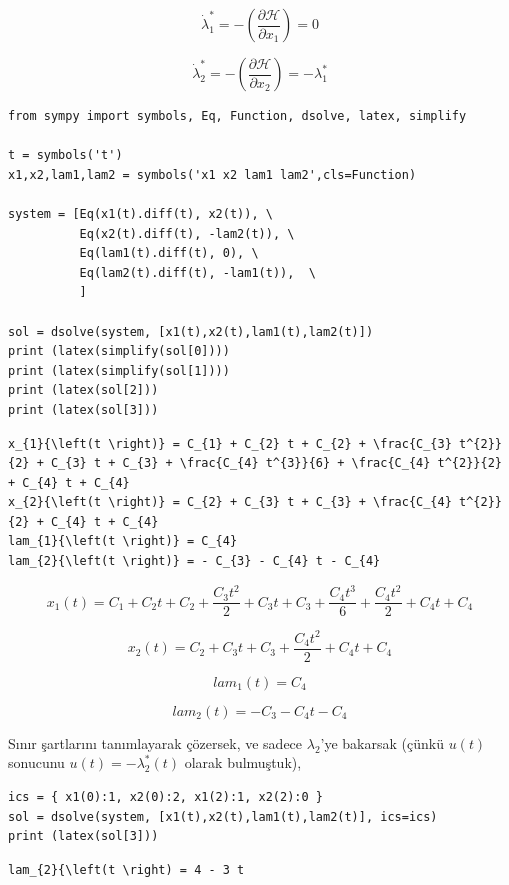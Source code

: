 \documentclass[12pt,fleqn]{article}\usepackage{../../common}
\begin{document}
$$
\dot{\lambda}_1^\ast = - \left( \frac{\partial \mathcal{H}}{\partial x_1} \right) = 0
$$

$$
\dot{\lambda}_2^\ast = - \left( \frac{\partial \mathcal{H}}{\partial x_2} \right) = 
- \lambda_1^\ast
$$

\begin{verbatim}
from sympy import symbols, Eq, Function, dsolve, latex, simplify

t = symbols('t') 
x1,x2,lam1,lam2 = symbols('x1 x2 lam1 lam2',cls=Function)

system = [Eq(x1(t).diff(t), x2(t)), \
          Eq(x2(t).diff(t), -lam2(t)), \
          Eq(lam1(t).diff(t), 0), \
          Eq(lam2(t).diff(t), -lam1(t)),  \
          ]

sol = dsolve(system, [x1(t),x2(t),lam1(t),lam2(t)])
print (latex(simplify(sol[0])))
print (latex(simplify(sol[1])))
print (latex(sol[2]))
print (latex(sol[3]))
\end{verbatim}

\begin{verbatim}
x_{1}{\left(t \right)} = C_{1} + C_{2} t + C_{2} + \frac{C_{3} t^{2}}{2} + C_{3} t + C_{3} + \frac{C_{4} t^{3}}{6} + \frac{C_{4} t^{2}}{2} + C_{4} t + C_{4}
x_{2}{\left(t \right)} = C_{2} + C_{3} t + C_{3} + \frac{C_{4} t^{2}}{2} + C_{4} t + C_{4}
lam_{1}{\left(t \right)} = C_{4}
lam_{2}{\left(t \right)} = - C_{3} - C_{4} t - C_{4}
\end{verbatim}

$$
x_{1}{\left(t \right)} = C_{1} + C_{2} t + C_{2} + \frac{C_{3} t^{2}}{2} + C_{3} t + C_{3} + \frac{C_{4} t^{3}}{6} + \frac{C_{4} t^{2}}{2} + C_{4} t + C_{4}
$$

$$
x_{2}{\left(t \right)} = C_{2} + C_{3} t + C_{3} + \frac{C_{4} t^{2}}{2} + C_{4} t + C_{4}
$$

$$
lam_{1}{\left(t \right)} = C_{4}
$$

$$
lam_{2}{\left(t \right)} = - C_{3} - C_{4} t - C_{4}
$$

Sınır şartlarını tanımlayarak çözersek, ve sadece $\lambda_2$'ye
bakarsak (çünkü $u(t)$ sonucunu $u(t) = -\lambda_2^\ast (t)$ olarak bulmuştuk),

\begin{verbatim}
ics = { x1(0):1, x2(0):2, x1(2):1, x2(2):0 } 
sol = dsolve(system, [x1(t),x2(t),lam1(t),lam2(t)], ics=ics)
print (latex(sol[3]))
\end{verbatim}

\begin{verbatim}
lam_{2}{\left(t \right) = 4 - 3 t
\end{verbatim}
\end{document}

